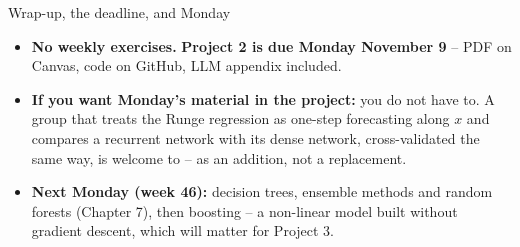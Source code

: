 \documentclass[10pt,aspectratio=169]{beamer}
\begin{document}
\begin{frame}{Wrap-up, the deadline, and Monday}
\begin{itemize}
  \item \textbf{No weekly exercises.}  \textbf{Project 2 is due Monday
        November 9} -- PDF on Canvas, code on GitHub, LLM appendix included.
  \item \textbf{If you want Monday's material in the project:} you do not
        have to.  A group that treats the Runge regression as one-step
        forecasting along $x$ and compares a recurrent network with its dense
        network, cross-validated the same way, is welcome to -- as an
        addition, not a replacement.
  \item \textbf{Next Monday (week 46):} decision trees, ensemble methods and
        random forests (Chapter 7), then boosting -- a non-linear model built
        without gradient descent, which will matter for Project 3.
\end{itemize}
\end{frame}
\end{document}
